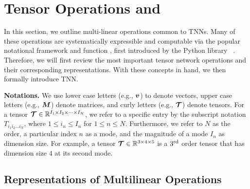 \section{Tensor Operations and \einsum}
\label{sec:preliminary}

In this section, we outline multi-linear operations common to TNNs. Many of these operations are systematically expressible and computable via the popular notational framework and function \einsum, first introduced by the Python library \numpy~\citep{harris2020array}.
Therefore, we will first review the most important tensor network operations and their corresponding \einsum representations. With these concepts in hand, we then formally introduce TNN.

\textbf{Notations.}
We use lower case letters (e.g., $\bm{v}$) to denote vectors, 
upper case letters (e.g., $\bm{M}$) denote matrices, 
and curly letters (e.g., $\bm{\mathcal{T}}$) denote tensors.
For a tensor $\bm{\mathcal{T}} \in \mathbb{R}^{I_1 \times I_2 \times \cdots \times I_N}$, we refer to a specific entry by the subscript notation $T_{i_1 i_2 \dots i_N}$, where $1 \leq i_n \leq I_n$ for $1 \leq n \leq N$.
Furthermore, we refer to $N$ as the order, a particular index $n$ as a mode, and the magnitude of a mode $I_n$ as dimension size.
For example, a tensor $\bm{\mathcal{T}} \in \mathbb{R}^{3 \times 4 \times 5}$ is a $3^{\mathrm{rd}}$ order tensor that has dimension size $4$ at its second mode.

\subsection{Representations of Multilinear Operations}
\label{sub:multi-ops}

